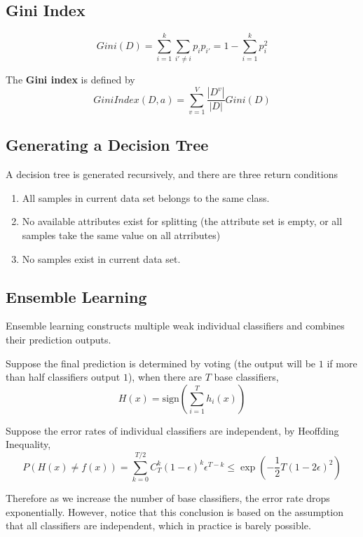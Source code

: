     \subsection{Gini Index}
        \begin{definition}[Gini]
            \[ Gini(D) = \sum_{i=1}^{k}\sum_{i' \neq i} p_ip_{i'} = 1 - \sum_{i=1}^k p_i^2 \]
        \end{definition}

        \begin{definition}
            The \textbf{Gini index} is defined by
            \[ GiniIndex(D, a) = \sum_{v=1}^V\frac{|D^v|}{|D|}Gini(D) \]
        \end{definition}

    \subsection{Generating a Decision Tree}
        A decision tree is generated recursively, and there are three return conditions
        \begin{enumerate}
            \item All samples in current data set belongs to the same class.
            \item No available attributes exist for splitting (the attribute set is empty, or all samples take the same value on all atrributes)
            \item No samples exist in current data set.
        \end{enumerate}

    \subsection{Ensemble Learning}
        Ensemble learning constructs multiple weak individual classifiers and combines their prediction outputs.

        Suppose the final prediction is determined by voting (the output will be $1$ if more than half classifiers output $1$), when there are $T$ base classifiers,
        \[ H(x) = \mathrm{sign}\left( \sum_{i=1}^T h_i(x) \right) \]

        Suppose the error rates of individual classifiers are independent, by Heoffding Inequality,
        \[ P(H(x) \neq f(x)) = \sum_{k=0}^{T/2}C_T^k(1-\epsilon)^k\epsilon^{T-k} \le \exp\left( -\frac{1}{2}T(1-2\epsilon)^2 \right) \]

        Therefore as we increase the number of base classifiers, the error rate drops exponentially. However, notice that this conclusion is based on the assumption that all classifiers are independent, which in practice is barely possible.

